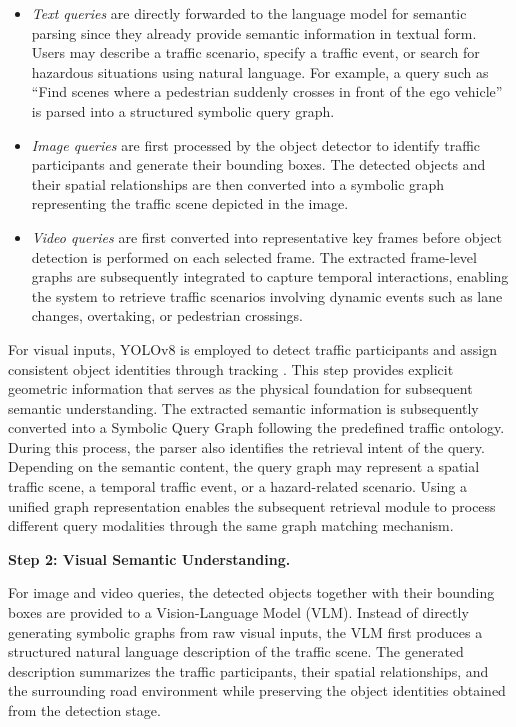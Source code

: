 \documentclass[a4paper, 11pt]{article} %
\begin{document}
\begin{itemize}
    \item \textit{Text queries} are directly forwarded to the language model for semantic parsing since they already provide semantic information in textual form. Users may describe a traffic scenario, specify a traffic event, or search for hazardous situations using natural language. For example, a query such as ``Find scenes where a pedestrian suddenly crosses in front of the ego vehicle'' is parsed into a structured symbolic query graph.

    \item \textit{Image queries} are first processed by the object detector to identify traffic participants and generate their bounding boxes. The detected objects and their spatial relationships are then converted into a symbolic graph representing the traffic scene depicted in the image.

    \item \textit{Video queries} are first converted into representative key frames before object detection is performed on each selected frame. The extracted frame-level graphs are subsequently integrated to capture temporal interactions, enabling the system to retrieve traffic scenarios involving dynamic events such as lane changes, overtaking, or pedestrian crossings.
\end{itemize}
For visual inputs, YOLOv8 is employed to detect traffic participants and assign consistent object identities through tracking \cite{redmon2016you}. This step provides explicit geometric information that serves as the physical foundation for subsequent semantic understanding.
The extracted semantic information is subsequently converted into a Symbolic Query Graph following the predefined traffic ontology. During this process, the parser also identifies the retrieval intent of the query. Depending on the semantic content, the query graph may represent a spatial traffic scene, a temporal traffic event, or a hazard-related scenario. Using a unified graph representation enables the subsequent retrieval module to process different query modalities through the same graph matching mechanism.

\vspace{0.5em}

\textbf{Step 2: Visual Semantic Understanding.}

For image and video queries, the detected objects together with their bounding boxes are provided to a Vision-Language Model (VLM). Instead of directly generating symbolic graphs from raw visual inputs, the VLM first produces a structured natural language description of the traffic scene. The generated description summarizes the traffic participants, their spatial relationships, and the surrounding road environment while preserving the object identities obtained from the detection stage.
\end{document}
